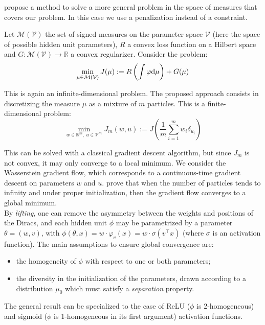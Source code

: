 \documentclass[a4paper, 11pt]{scrartcl}
\begin{document}
\cite{chizat2018global} propose a method to solve a more general problem in the space of measures that covers our problem. In this case we use a penalization instead of a constraint.

Let $\mathcal{M}(\mathcal{V})$ the set of signed measures on the parameter space $\mathcal{V}$ (here the space of possible hidden unit parameters), $R$ a convex loss function on a Hilbert space and $G:\mathcal{M}(\mathcal{V}) \rightarrow \mathbb{R}$ a convex regularizer. Consider the problem:
\begin{equation}
\min_{\mu \in \mathcal{M}(\mathcal{V})} J(\mu):=R\left( \int \varphi \textnormal{d}\mu \right) + G(\mu)
\end{equation}

This is again an infinite-dimensional problem. The proposed approach consists in discretizing the measure $\mu$ as a mixture of $m$ particles. This is a finite-dimensional problem:
\begin{equation}
\min_{w \in \mathbb{R}^m,~u \in \mathcal{V}^m} J_m(w, u):=J\left(  \frac{1}{m} \sum_{i=1}^m w_i \delta_{u_i}\right)
\end{equation}

This can be solved with a classical gradient descent algorithm, but since $J_m$ is not convex, it may only converge to a local minimum. We consider the Wasserstein gradient flow, which corresponds to a continuous-time gradient descent on parameters $w$ and $u$. \cite{chizat2018global} prove that when the number of particles tends to infinity and under proper initialization, then the gradient flow converges to a global minimum.\\

By \textit{lifting}, one can remove the asymmetry between the weights and positions of the Diracs, and each hidden unit $\phi$ may be parametrized by a parameter $\theta = (w, v)$, with $\phi(\theta, x)=w \cdot \varphi_v(x) = w\cdot \sigma(v^\top x)$ (where $\sigma$ is an activation function). The main assumptions to ensure global convergence are:
\begin{itemize}
\item the homogeneity of $\phi$ with respect to one or both parameters;
\item the diversity in the initialization of the parameters, drawn according to a distribution $\mu_0$ which must satisfy a \textit{separation} property.\\
\end{itemize}

The general result can be specialized to the case of ReLU ($\phi$ is 2-homogeneous) and sigmoid ($\phi$ is 1-homogeneous in its first argument) activation functions.
\end{document}
